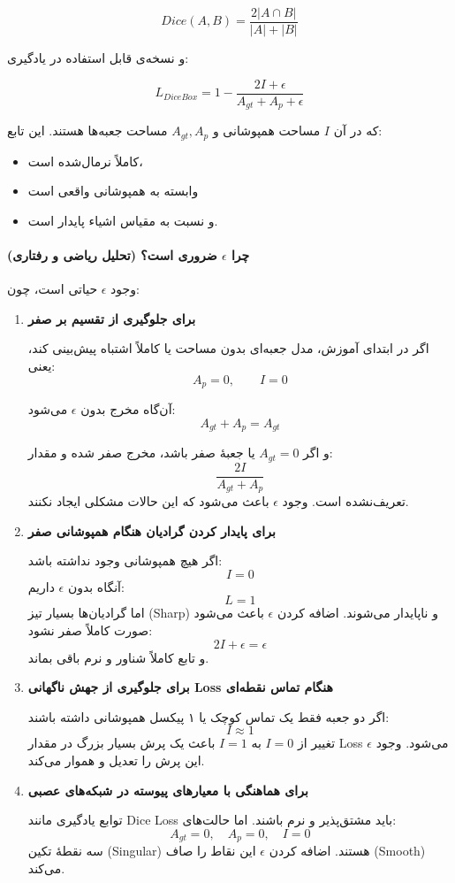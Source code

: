 \documentclass{article}
\begin{document}
$$
Dice(A,B) = \frac{2|A\cap B|}{|A| + |B|}
$$

و نسخه‌ی قابل استفاده در یادگیری:

$$
L_{DiceBox} = 1 - \frac{2I + \epsilon}{A_{gt} + A_p + \epsilon}
$$

که در آن $I$ مساحت همپوشانی و $A_{gt}, A_p$ مساحت جعبه‌ها هستند. این تابع:
\begin{itemize}
	\item کاملاً نرمال‌شده است،
	\item وابسته به همپوشانی واقعی است
	\item و نسبت به مقیاس اشیاء پایدار است.
\end{itemize}

\paragraph{چرا $\epsilon$ ضروری است؟ (تحلیل ریاضی و رفتاری)}
وجود $\epsilon$ حیاتی است، چون:

\begin{enumerate}
	\item \textbf{برای جلوگیری از تقسیم بر صفر}
	
	اگر در ابتدای آموزش، مدل جعبه‌ای بدون مساحت یا کاملاً اشتباه پیش‌بینی کند، یعنی:
	$$ A_p = 0,\qquad I = 0 $$
	
	آن‌گاه مخرج بدون $\epsilon$ می‌شود:
	$$ A_{gt} + A_p = A_{gt} $$
	
	و اگر $A_{gt}=0$ یا جعبهٔ صفر باشد، مخرج صفر شده و مقدار:
	$$ \frac{2I}{A_{gt}+A_p} $$
	تعریف‌نشده است. وجود $\epsilon$ باعث می‌شود که این حالات مشکلی ایجاد نکنند.
	
	\item \textbf{برای پایدار کردن گرادیان هنگام همپوشانی صفر}
	
	اگر هیچ همپوشانی وجود نداشته باشد:
	$$ I=0 $$
	آنگاه بدون $\epsilon$ داریم:
	$$ L = 1 $$
	اما گرادیان‌ها بسیار تیز (Sharp) و ناپایدار می‌شوند. اضافه کردن $\epsilon$ باعث می‌شود صورت کاملاً صفر نشود:
	$$ 2I + \epsilon = \epsilon $$
	و تابع کاملاً شناور و نرم باقی بماند.
	
	\item \textbf{برای جلوگیری از جهش ناگهانی Loss هنگام تماس نقطه‌ای}
	
	اگر دو جعبه فقط یک تماس کوچک یا ۱ پیکسل همپوشانی داشته باشند:
	$$ I \approx 1 $$
	تغییر از $I=0$ به $I=1$ باعث یک پرش بسیار بزرگ در مقدار Loss می‌شود. وجود $\epsilon$ این پرش را تعدیل و هموار می‌کند.
	
	\item \textbf{برای هماهنگی با معیارهای پیوسته در شبکه‌های عصبی}
	
	توابع یادگیری مانند Dice Loss باید مشتق‌پذیر و نرم باشند. اما حالت‌های:
	$$ A_{gt}=0,\quad A_p=0,\quad I=0 $$
	سه نقطهٔ تکین (Singular) هستند. اضافه کردن $\epsilon$ این نقاط را صاف (Smooth) می‌کند.
\end{enumerate}
\end{document}

